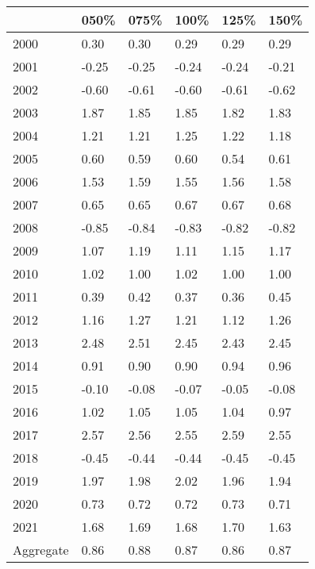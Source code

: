 \begin{tabular}{llllll}
\toprule
 & 050\% & 075\% & 100\% & 125\% & 150\% \\
\midrule
2000 & 0.30 & 0.30 & 0.29 & 0.29 & 0.29 \\
2001 & -0.25 & -0.25 & -0.24 & -0.24 & -0.21 \\
2002 & -0.60 & -0.61 & -0.60 & -0.61 & -0.62 \\
2003 & 1.87 & 1.85 & 1.85 & 1.82 & 1.83 \\
2004 & 1.21 & 1.21 & 1.25 & 1.22 & 1.18 \\
2005 & 0.60 & 0.59 & 0.60 & 0.54 & 0.61 \\
2006 & 1.53 & 1.59 & 1.55 & 1.56 & 1.58 \\
2007 & 0.65 & 0.65 & 0.67 & 0.67 & 0.68 \\
2008 & -0.85 & -0.84 & -0.83 & -0.82 & -0.82 \\
2009 & 1.07 & 1.19 & 1.11 & 1.15 & 1.17 \\
2010 & 1.02 & 1.00 & 1.02 & 1.00 & 1.00 \\
2011 & 0.39 & 0.42 & 0.37 & 0.36 & 0.45 \\
2012 & 1.16 & 1.27 & 1.21 & 1.12 & 1.26 \\
2013 & 2.48 & 2.51 & 2.45 & 2.43 & 2.45 \\
2014 & 0.91 & 0.90 & 0.90 & 0.94 & 0.96 \\
2015 & -0.10 & -0.08 & -0.07 & -0.05 & -0.08 \\
2016 & 1.02 & 1.05 & 1.05 & 1.04 & 0.97 \\
2017 & 2.57 & 2.56 & 2.55 & 2.59 & 2.55 \\
2018 & -0.45 & -0.44 & -0.44 & -0.45 & -0.45 \\
2019 & 1.97 & 1.98 & 2.02 & 1.96 & 1.94 \\
2020 & 0.73 & 0.72 & 0.72 & 0.73 & 0.71 \\
2021 & 1.68 & 1.69 & 1.68 & 1.70 & 1.63 \\
Aggregate & 0.86 & 0.88 & 0.87 & 0.86 & 0.87 \\
\bottomrule
\end{tabular}
